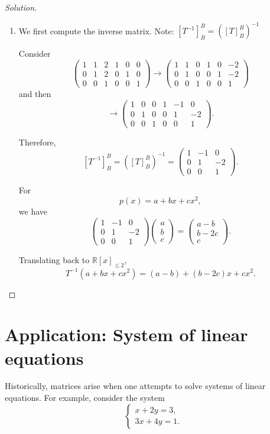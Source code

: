 \documentclass[12pt]{article}
\newenvironment{solution}
{\begin{proof}[Solution]}
{\end{proof}}
\begin{document}
\begin{solution}
\begin{enumerate}
\item[(c)]
We first compute the inverse matrix. Note: $[T^{-1}]_B^B = ([T]_B^B)^{-1}$

Consider
\[
\left(
\begin{array}{ccc|ccc}
1&1&2&1&0&0\\
0&1&2&0&1&0\\
0&0&1&0&0&1
\end{array}
\right)
\longrightarrow
\left(
\begin{array}{ccc|ccc}
1&1&0&1&0&-2\\
0&1&0&0&1&-2\\
0&0&1&0&0&1
\end{array}
\right)
\]
and then
\[
\longrightarrow
\left(
\begin{array}{ccc|ccc}
1&0&0&1&-1&0\\
0&1&0&0&1&-2\\
0&0&1&0&0&1
\end{array}
\right).
\]

Therefore,
\[
[T^{-1}]^B_B
=
\left([T]^B_B\right)^{-1}
=
\begin{pmatrix}
1&-1&0\\
0&1&-2\\
0&0&1
\end{pmatrix}.
\]

For
\[
p(x)=a+bx+cx^2,
\]
we have
\[
\begin{pmatrix}
1&-1&0\\
0&1&-2\\
0&0&1
\end{pmatrix}
\begin{pmatrix}
a\\b\\c
\end{pmatrix}
=
\begin{pmatrix}
a-b\\
b-2c\\
c
\end{pmatrix}.
\]

Translating back to $\mathbb{R}[x]_{\leq2}$,
\[
\boxed{
T^{-1}(a+bx+cx^2)
=
(a-b)+(b-2c)x+cx^2
}.
\]

\end{enumerate}
\end{solution}

\section{Application: System of linear equations}

Historically, matrices arise when one attempts to solve systems of linear
equations. For example, consider the system
\[
\begin{cases}
x+2y=3,\\
3x+4y=1.
\end{cases}
\]
\end{document}
